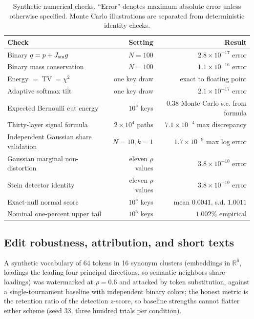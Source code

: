 \documentclass[11pt]{article}
\theoremstyle{definition}
\theoremstyle{remark}
\DeclareMathOperator{\TV}{TV}
\newcommand{\R}{\mathbb{R}}
\begin{document}
\begin{table}[t]
\centering
\caption{Synthetic numerical checks. ``Error'' denotes maximum absolute error unless otherwise specified. Monte Carlo illustrations are separated from deterministic identity checks.}
\label{tab:checks}
\small
\begin{tabularx}{\textwidth}{@{}Xrr@{}}
\toprule
Check & Setting & Result \\
\midrule
Binary $q=p+J_{\rm sm}g$ & $N=100$ & $2.8\times10^{-17}$ error \\
Binary mass conservation & $N=100$ & $1.1\times10^{-16}$ error \\
Energy $=\TV=\chi^2$ & one key draw & exact to floating point \\
Adaptive softmax tilt & one key draw & $2.1\times10^{-17}$ error \\
Expected Bernoulli cut energy & $10^5$ keys & $0.38$ Monte Carlo s.e. from formula \\
Thirty-layer signal formula & $2\times10^4$ paths & $7.1\times10^{-4}$ max discrepancy \\
Independent Gaussian share validation & $N=10,k=1$ & $1.7\times10^{-9}$ max log error \\
Gaussian marginal non-distortion & eleven $\rho$ values & $3.8\times10^{-10}$ error \\
Stein detector identity & eleven $\rho$ values & $3.8\times10^{-10}$ error \\
Exact-null normal score & $10^5$ keys & mean $0.0041$, s.d. $1.0011$ \\
Nominal one-percent upper tail & $10^5$ keys & $1.002\%$ empirical \\
\bottomrule
\end{tabularx}
\end{table}

\subsection{Edit robustness, attribution, and short texts}

A synthetic vocabulary of 64 tokens in 16 synonym clusters (embeddings
in $\R^6$, loadings the leading four principal directions, so semantic
neighbors share loadings) was watermarked at $\rho=0.6$ and attacked by
token substitution, against a single-tournament baseline with
independent binary colors; the honest metric is the retention ratio of
the detection $z$-score, so baseline strengths cannot flatter either
scheme (seed 33, three hundred trials per condition).
\end{document}
